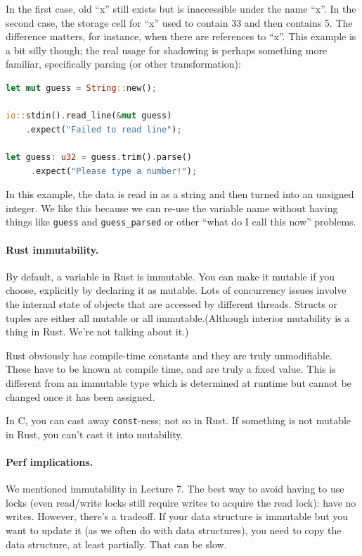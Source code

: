 \documentclass[a4paper]{report}
\begin{document}
In the first case, old ``x'' still exists but is inaccessible under the name ``x''.
In the second case, the storage cell for ``x'' used to contain 33 and then contains 5.
The difference matters, for instance, when there are references to ``x''. This example is a bit silly though; the real usage for shadowing is perhaps something more familiar, specifically parsing (or other transformation): 

\begin{lstlisting}[language=Rust]
let mut guess = String::new();

io::stdin().read_line(&mut guess)
    .expect("Failed to read line");

let guess: u32 = guess.trim().parse()
     .expect("Please type a number!");
\end{lstlisting}

In this example, the data is read in as a string and then turned into an unsigned integer. We like this because we can re-use the variable name without having things like \texttt{guess} and \texttt{guess\_parsed} or other ``what do I call this now'' problems.

\paragraph{Rust immutability.} 
By default, a variable in Rust is immutable. You can make it mutable if you choose, explicitly by declaring it as mutable. Lots of concurrency issues involve the internal state of objects that are accessed by different threads. Structs or tuples are either all mutable or all immutable.(Although interior mutability is a thing in Rust. We're not talking about it.)

Rust obviously has compile-time constants and they are truly unmodifiable. These have to be known at compile time, and are truly a fixed value. This is different from an immutable type which is determined at runtime but cannot be changed once it has been assigned.

In C, you can cast away {\tt const}-ness; not so in Rust.
If something is not mutable in Rust, you can't cast it into mutability.


\paragraph{Perf implications.}
We mentioned immutability in Lecture 7. The best way to avoid having
to use locks (even read/write locks still require writes to acquire
the read lock): have no writes.  However, there's a tradeoff. If your
data structure is immutable but you want to update it (as we often do
with data structures), you need to copy the data structure, at least
partially. That can be slow.
\end{document}
